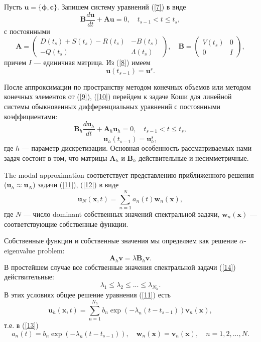 \documentclass[authoryear]{elsarticle}
\begin{document}
Пусть $\bm u = \{\bm \phi, \bm c\}$. Запишем систему уравнений (\ref{7}) в виде
\begin{equation}\label{9}
 \bm B \frac{d \bm u}{d t} + \bm A \bm u = 0,
 \quad t_{s-1} < t \leq t_s,
\end{equation} 
с постоянными
\[
 \bm A = 
 \begin{pmatrix}
 D(t_s)+S(t_s) - R(t_s) &  - B(t_s) \\
 - Q(t_s) & \Lambda(t_s) 
 \end{pmatrix} ,
 \quad  \bm B = 
 \begin{pmatrix}
 V(t_s) & 0 \\
 0 & I 
 \end{pmatrix} ,
\] 
причем $I$ --- единичная матрица.
Из (\ref{8}) имеем
\begin{equation}\label{10}
 \bm u(t_{s-1}) = \bm u^s .
\end{equation} 

После аппроксимации по пространству методом конечных объемов или методом
конечных элементов  от (\ref{9}), (\ref{10}) 
перейдем к задаче Коши для линейной системы обыкновенных дифференциальных
уравнений с постоянными коэффициентами:
\begin{equation}\label{11}
 \bm B_h \frac{d \bm u_h}{d t} + \bm A_h \bm u_h = 0,
 \quad t_{s-1} < t \leq t_s,
\end{equation}   
\begin{equation}\label{12}
 \bm u_h(t_{s-1}) = \bm u_h^s ,
\end{equation} 
где $h$ --- параметр дискретизации. Основная особенность рассматриваемых 
нами задач состоит в том, что матрицы $\bm A_h$ и $\bm B_h$ 
действительные и несимметричные.

The modal approximation соответствует представлению 
приближенного решения ($\bm u_h \approx \bm u_N$) задачи  (\ref{11}), (\ref{12}) в виде
\begin{equation}\label{13}
 \bm u_N(\bm x, t) =
 \sum_{n=1}^{N} a_n(t) \bm w_n(\bm x),
\end{equation} 
где $N$ --- число dominant собственных значений спектральной задачи,
$\bm w_n(\bm x)$ --- соответствующие собственные функции.

Собственные функции и собственные значения мы определяем как решение $\alpha$-eigenvalue problem:
\begin{equation}\label{14}
 \bm A_h \bm v = \lambda  \bm B_h \bm v .
\end{equation} 
В простейшем случае все собственные значения спектральной задачи (\ref{14}) действительные:
\[
 \lambda_1 \leq \lambda_2 \leq ... \leq \lambda_{N_h} .
\] 
В этих условиях \citep{Laub2005,Ortega1987} общее решение уравнения (\ref{11}) есть
\begin{equation}\label{15}
 \bm u_h(\bm x, t) =
 \sum_{n=1}^{N_h} b_n \exp(-\lambda_n (t-t_{s-1})) \bm v_n(\bm x) , 
\end{equation} 
т.е. в (\ref{13}) 
\[
 a_n(t) = b_n \exp(-\lambda_n (t-t_{s-1})) ,
 \quad \bm w_n(\bm x) = \bm v_n(\bm x),
 \quad n = 1,2, ..., N .  
\] 
\end{document}
